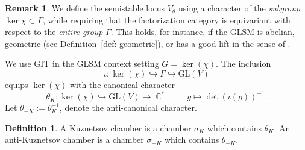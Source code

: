 \documentclass[reqno, 12pt]{amsart}
\theoremstyle{definition}
\newtheorem{definition}[theorem]{Definition}
\newtheorem{remark}[theorem]{Remark}
\newcommand{\op}[1]{\operatorname{#1}}
\newcommand{\newterm}{\textsf}
\newcommand{\dan}[1]{{\color{ForestGreen} \sf DK: [#1]}}
\def\ker{\op{\mbox{ker}}}
\def\C{\op{\mathbb{C}}}
\numberwithin{equation}{section}
\begin{document}
\begin{remark} \label{rem:stability_vs_equivariance}
    We define the semistable locus $V_{\theta}$ using a character of the \emph{subgroup} $\ker \chi \subset \Gamma$, while requiring that the factorization category is equivariant with respect to the \emph{entire group} $\Gamma$. This holds, for instance, if the GLSM is abelian, geometric (see Definition~\ref{def: geometric}), or has a good lift in the sense of \cite[Section 1.1]{FJR18}.

\end{remark}


We use GIT in the GLSM context setting $G = \ker(\chi)$. The inclusion
\[
\iota: \ker(\chi) \hookrightarrow \Gamma \hookrightarrow \text{GL}(V)
\]
equips $\ker(\chi)$ with the canonical character
\begin{equation}\label{eqref: canonical character}
\theta_K : \ker(\chi) \hookrightarrow \text{GL}(V) \rightarrow \C^* \hspace{1cm} g \mapsto \det(\iota(g))^{-1}.
\end{equation}
Let $\theta_{-K} := \theta_K^{-1}$, denote the anti-canonical character. 



\begin{definition}\label{def: Kuznetsov chamber}
A \newterm{Kuznetsov chamber} is a chamber $\sigma_K$ which contains $\theta_K$.  An \newterm{anti-Kuznetsov chamber} is a chamber $\sigma_{-K}$ which contains $\theta_{-K}$. 
\end{definition}
\end{document}
